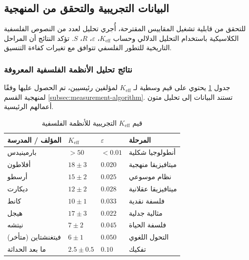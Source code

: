 \documentclass[11pt,a4paper]{article}
\newcommand{\eps}{\varepsilon}
\begin{document}
	\subsection{البيانات التجريبية والتحقق من المنهجية}
	\label{subsec:empirical-validation}
	
	للتحقق من قابلية تشغيل المقاييس المقترحة، أُجري تحليل لعدد من النصوص الفلسفية الكلاسيكية باستخدام التحليل الدلالي وحساب \(K_{\mathrm{eff}}\)، \(\eps\)، \(R\)، \(S\). تؤكد النتائج أن المراحل التاريخية للتطور الفلسفي تتوافق مع تغيرات كفاءة التنسيق.
	
	\subsubsection{نتائج تحليل الأنظمة الفلسفية المعروفة}
	
	جدول \ref{tab:empirical-keff} يحتوي على قيم وسطية لـ \(K_{\mathrm{eff}}\) لمؤلفين رئيسيين، تم الحصول عليها وفقًا لمنهجية القسم \ref{subsec:measurement-algorithm}. تستند البيانات إلى تحليل متون أعمالهم الرئيسية.
	
	\begin{table}[H]
		\centering
		\caption{قيم \(K_{\mathrm{eff}}\) التجريبية للأنظمة الفلسفية}
		\label{tab:empirical-keff}
		\begin{tabular}{p{3cm}p{2cm}p{2.5cm}p{3cm}}
			\toprule
			\textbf{المؤلف / المدرسة} & \(K_{\mathrm{eff}}\) & \(\eps\) & \textbf{المرحلة} \\
			\midrule
			بارمينيدس & \(>50\) & \(<0.01\) & أنطولوجيا شكلية \\
			أفلاطون & \(18 \pm 3\) & \(0.020\) & ميتافيزيقا منهجية \\
			أرسطو & \(15 \pm 2\) & \(0.025\) & نظام موسوعي \\
			ديكارت & \(12 \pm 2\) & \(0.028\) & ميتافيزيقا عقلانية \\
			كانط & \(10 \pm 1\) & \(0.033\) & فلسفة نقدية \\
			هيجل & \(17 \pm 3\) & \(0.022\) & مثالية جدلية \\
			نيتشه & \(7 \pm 2\) & \(0.045\) & فلسفة الحياة \\
			فيتغنشتاين (متأخر) & \(6 \pm 1\) & \(0.050\) & التحول اللغوي \\
			ما بعد الحداثة & \(2.5 \pm 0.5\) & \(0.10\) & تفكيك \\
			\bottomrule
		\end{tabular}
	\end{table}
	
\end{document}
